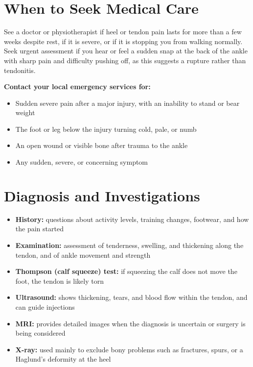 \section*{When to Seek Medical Care}
See a doctor or physiotherapist if heel or tendon pain lasts for more than a few weeks despite rest, if it is severe, or if it is stopping you from walking normally. Seek urgent assessment if you hear or feel a sudden snap at the back of the ankle with sharp pain and difficulty pushing off, as this suggests a rupture rather than tendonitis.

\textbf{Contact your local emergency services for:}
\begin{itemize}
    \item Sudden severe pain after a major injury, with an inability to stand or bear weight
    \item The foot or leg below the injury turning cold, pale, or numb
    \item An open wound or visible bone after trauma to the ankle
    \item Any sudden, severe, or concerning symptom
\end{itemize}

\section*{Diagnosis and Investigations}
\begin{itemize}
    \item \textbf{History:} questions about activity levels, training changes, footwear, and how the pain started
    \item \textbf{Examination:} assessment of tenderness, swelling, and thickening along the tendon, and of ankle movement and strength
    \item \textbf{Thompson (calf squeeze) test:} if squeezing the calf does not move the foot, the tendon is likely torn
    \item \textbf{Ultrasound:} shows thickening, tears, and blood flow within the tendon, and can guide injections
    \item \textbf{MRI:} provides detailed images when the diagnosis is uncertain or surgery is being considered
    \item \textbf{X-ray:} used mainly to exclude bony problems such as fractures, spurs, or a Haglund's deformity at the heel
\end{itemize}

